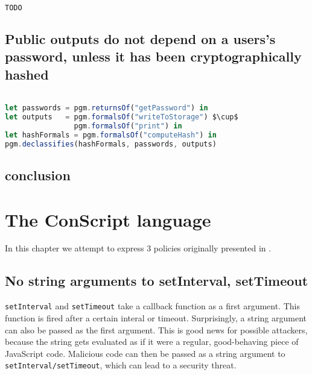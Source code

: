 \begin{lstlisting}[label={lst:Policy5PidginQL},language=JavaScript,caption=Policy 5 in PidginQL,mathescape=true]  % float=t?

TODO
\end{lstlisting}

\subsection{Public outputs do not depend on a users's password, unless it has been cryptographically hashed}

\begin{lstlisting}[label={lst:Policy6PidginQL},language=JavaScript,caption=Policy 6 in PidginQL,mathescape=true]  % float=t?

let passwords = pgm.returnsOf("getPassword") in 
let outputs   = pgm.formalsOf("writeToStorage") $\cup$
                pgm.formalsOf("print") in
let hashFormals = pgm.formalsOf("computeHash") in
pgm.declassifies(hashFormals, passwords, outputs)
\end{lstlisting}

\subsection{conclusion}

\section{The ConScript language}
\label{sec:ValidationConscript}

In this chapter we attempt to express 3 policies originally presented in \cite{ConScript}.

\subsection{No string arguments to setInterval, setTimeout}

\texttt{setInterval} and \texttt{setTimeout} take a callback function as a first argument. This function is fired after a certain interal or timeout. Surprisingly, a string argument can also be passed as the first argument. This is good news for possible attackers, because the string gets evaluated as if it were a regular, good-behaving piece of JavaScript code. Malicious code can then be passed as a string argument to \texttt{setInterval/setTimeout}, which can lead to a security threat.

